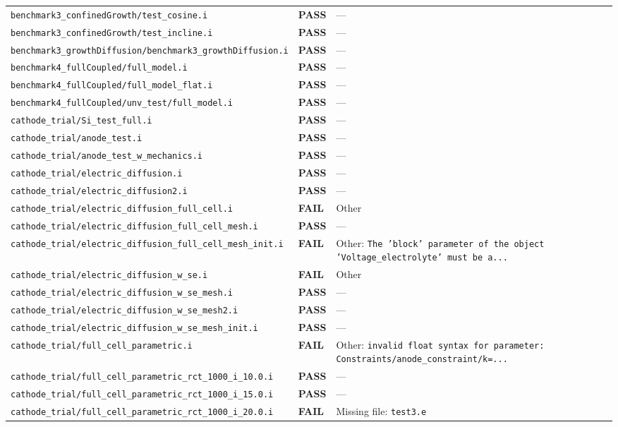 \documentclass[10pt,letterpaper]{article}
\newcommand{\PASS}{\textcolor{passgreen}{\textbf{PASS}}}
\newcommand{\FAIL}{\textcolor{failred}{\textbf{FAIL}}}
\newcommand{\code}[1]{\texttt{\small #1}}
\begin{document}
\begin{longtable}{p{} l p{}}
\code{benchmark3\_confinedGrowth/test\_cosine.i} & \PASS & --- \\
\code{benchmark3\_confinedGrowth/test\_incline.i} & \PASS & --- \\
\code{benchmark3\_growthDiffusion/benchmark3\_growthDiffusion.i} & \PASS & --- \\
\code{benchmark4\_fullCoupled/full\_model.i} & \PASS & --- \\
\code{benchmark4\_fullCoupled/full\_model\_flat.i} & \PASS & --- \\
\code{benchmark4\_fullCoupled/unv\_test/full\_model.i} & \PASS & --- \\
\code{cathode\_trial/Si\_test\_full.i} & \PASS & --- \\
\code{cathode\_trial/anode\_test.i} & \PASS & --- \\
\code{cathode\_trial/anode\_test\_w\_mechanics.i} & \PASS & --- \\
\code{cathode\_trial/electric\_diffusion.i} & \PASS & --- \\
\code{cathode\_trial/electric\_diffusion2.i} & \PASS & --- \\
\code{cathode\_trial/electric\_diffusion\_full\_cell.i} & \FAIL & Other \\
\code{cathode\_trial/electric\_diffusion\_full\_cell\_mesh.i} & \PASS & --- \\
\code{cathode\_trial/electric\_diffusion\_full\_cell\_mesh\_init.i} & \FAIL & Other: \code{The 'block' parameter of the object 'Voltage\_electrolyte' must be a...} \\
\code{cathode\_trial/electric\_diffusion\_w\_se.i} & \FAIL & Other \\
\code{cathode\_trial/electric\_diffusion\_w\_se\_mesh.i} & \PASS & --- \\
\code{cathode\_trial/electric\_diffusion\_w\_se\_mesh2.i} & \PASS & --- \\
\code{cathode\_trial/electric\_diffusion\_w\_se\_mesh\_init.i} & \PASS & --- \\
\code{cathode\_trial/full\_cell\_parametric.i} & \FAIL & Other: \code{invalid float syntax for parameter: Constraints/anode\_constraint/k=...} \\
\code{cathode\_trial/full\_cell\_parametric\_rct\_1000\_i\_10.0.i} & \PASS & --- \\
\code{cathode\_trial/full\_cell\_parametric\_rct\_1000\_i\_15.0.i} & \PASS & --- \\
\code{cathode\_trial/full\_cell\_parametric\_rct\_1000\_i\_20.0.i} & \FAIL & Missing file: \code{test3.e} \\

\end{longtable}
\end{document}

